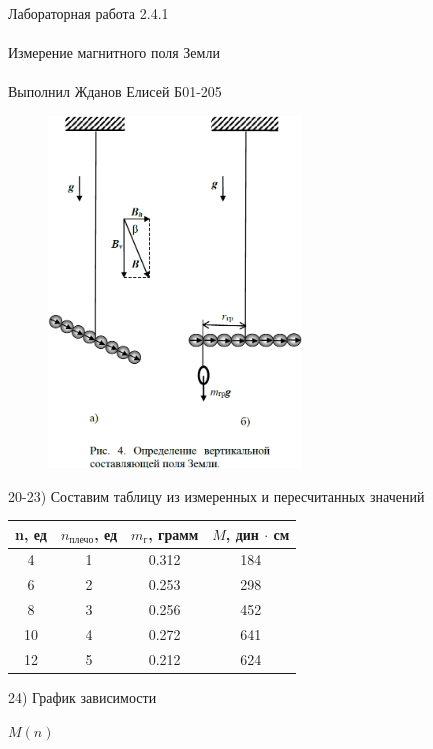 \documentclass{astroedu-lab}
\begin{document}
\begin{problem}{\huge Лабораторная работа 2.4.1\\\\Измерение магнитного поля Земли\\\\Выполнил Жданов Елисей Б01-205}
\begin{figure}[!h]
	\centering
	\includegraphics[width=0.6\textwidth]{4.png}
	\label{fig:boiler}
\end{figure}

20-23) Составим таблицу из измеренных и пересчитанных значений

\begin{center}
\begin{tabular}{|c|c|c|c|}
\hline 
n, ед & $n_\text{плечо}$, ед & $m_\text{г}$, грамм & $M$, дин $\cdot$ см \\
\hline
4  & 1 & 0.312 & 184 \\
6  & 2 & 0.253 & 298 \\
8  & 3 & 0.256 & 452 \\
10 & 4 & 0.272 & 641 \\
12 & 5 & 0.212 & 624 \\
\hline
\end{tabular}
\end{center}

\newpage

24) График зависимости

\begin{center}
	\Large $M(n)$
\end{center}


\end{problem}
\end{document}
